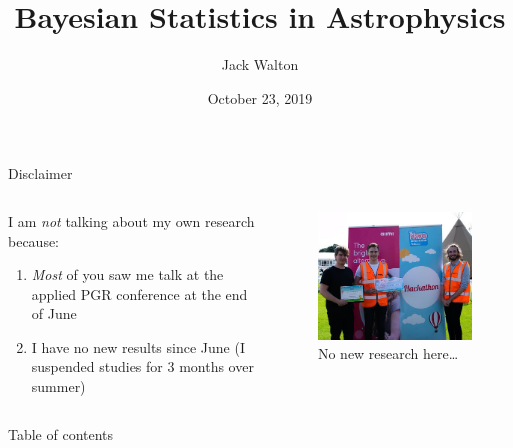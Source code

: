 \documentclass[aspectratio=169]{beamer}
\author{Jack Walton}
\title{Bayesian Statistics in Astrophysics}
\date{October 23, 2019}
\begin{document}
\maketitle

\begin{frame}{Disclaimer}
  \begin{columns}
    \begin{column}{0.5\textwidth}
      I am \emph{not} talking about my own research because:
      \begin{enumerate}
        \item \emph{Most} of you saw me talk at the applied PGR conference at the end
              of June
        \item I have no new results since June (I suspended studies for 3 months
              over summer)
      \end{enumerate}
    \end{column}
    \begin{column}{0.5\textwidth}
      \begin{figure}
        \includegraphics[width=\textwidth]{win.jpg}
        \caption{No new research here\ldots}
      \end{figure}
    \end{column}
  \end{columns}
\end{frame}

\begin{frame}{Table of contents}
  \tableofcontents
\end{frame}
\end{document}

